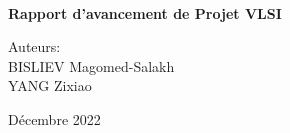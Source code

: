 \documentclass[10pt,a4paper]{article}
\begin{document}
	\begin{titlepage}
    \centering

	
    ~\\
	\vspace{0.3\textheight}  %


    {\Huge\textbf{Rapport d'avancement de Projet VLSI}}

    \vspace{0.025\textheight}   %


    \vspace{0.1\textheight}  %


    {\Large Auteurs: \\ \Large BISLIEV Magomed-Salakh \\ \Large YANG Zixiao}

    \vfill  %

    {\Large Décembre 2022}
    \vspace{0.1\textheight}  %



  \end{titlepage}
	\thispagestyle{empty} 													%
	\newpage
\end{document}
